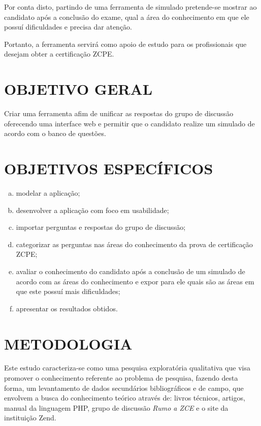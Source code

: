 Por conta disto, partindo de uma ferramenta de simulado pretende-se mostrar ao
candidato após a conclusão do exame, qual a área do conhecimento em que ele 
possuí dificuldades e precisa dar atenção.

Portanto, a ferramenta servirá como apoio de
estudo para os profissionais que desejam obter a certificação \acs{ZCPE}.

\section{OBJETIVO GERAL}

Criar uma ferramenta afim de unificar as respostas do grupo de discussão
oferecendo uma interface web e permitir que o candidato realize um simulado 
de acordo com o banco de questões.

\section{OBJETIVOS ESPECÍFICOS}

\begin{enumerate}[a)]
    \item modelar a aplicação;
    \item desenvolver a aplicação com foco em usabilidade;
    \item importar perguntas e respostas do grupo de discussão;
    \item categorizar as perguntas nas áreas do conhecimento da prova de
    certificação \acs{ZCPE};
    \item avaliar o conhecimento do candidato após a conclusão de um simulado 
    de acordo com as áreas do conhecimento e expor para ele quais são as áreas  em
    que este possuí mais dificuldades;
    \item apresentar os resultados obtidos.
\end{enumerate}

\section{METODOLOGIA}

Este estudo caracteriza-se como uma pesquisa exploratória qualitativa que visa
promover o conhecimento referente ao problema de pesquisa, fazendo desta forma,
um levantamento de dados secundários bibliográficos e de campo, que envolvem a
busca do conhecimento teórico através de: livros técnicos, artigos, manual da
linguagem \acs{PHP}, grupo de discussão \textit{Rumo a ZCE} e o site da
instituição Zend.